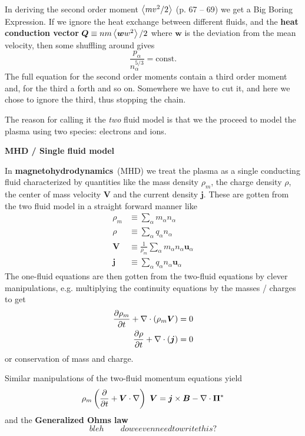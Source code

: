 \documentclass[10pt,landscape]{article}
\renewcommand{\vec}{\bm}
\newcommand{\topiccolor}{green}
\renewcommand{\section}[2]{%
	\renewcommand{\topiccolor}{#2}
	\begin{tcolorbox}[boxsep=0.5mm, left=1mm, right=1mm, top=0mm, bottom=0mm,
		colback=#2!30, colframe=#2, arc is angular]%
		\centering \textbf{#1}%
	\end{tcolorbox}%
	\nopagebreak%
}
\newcommand{\cbf}[1]{\textcolor{\topiccolor!80!black}{\textbf{#1}}}
\begin{document}
\begin{multicols*}{3}
In deriving the second order moment $\left\langle mv^2/2\right\rangle$ (p. 67 -- 69) we get
a Big Boring Expression\texttrademark.
If we ignore the heat exchange between different fluids, and the
\cbf{heat conduction vector}
$\vec Q \equiv n m \expval{\vec w w^2} / 2$
where $\vec w$ is the deviation from the mean velocity,
then some shuffling around gives
\[
	\frac{p_\alpha}{n_\alpha^{5/3}} = \text{const.}
\]
The full equation for the second order moments contain a third order moment and,
for the third a forth and so on.
Somewhere we have to cut it, and here we chose to ignore the third,
thus stopping the chain.

The reason for calling it the \emph{two} fluid model is that we the proceed
to model the plasma using two species: electrons and ions.

\section{MHD / Single fluid model}{lime}

In \cbf{magnetohydrodynamics} (MHD) we treat the plasma as a single conducting
fluid characterized by quantities like the mass density $\rho_m$, the charge
density $\rho$, the center of mass velocity $\vec V$ and the current density
$\vec j$.
These are gotten from the two fluid model in a straight forward manner like
\begin{align*}
	\rho_m &\equiv \sum_\alpha m_\alpha n_\alpha\\
	\rho &\equiv \sum_\alpha q_\alpha n_\alpha\\
	\vec V &\equiv \frac{1}{\rho_m} \sum_\alpha m_\alpha n_\alpha \vec u_\alpha\\
	\vec j &\equiv \sum_\alpha q_\alpha n_\alpha \vec u_\alpha
\end{align*}
The one-fluid equations are then gotten from the two-fluid equations by clever
manipulations, e.g. multiplying the continuity equations by the masses / charges
to get
\begin{align*}
	\diffp{\rho_m}{t} + \nabla \cdot (\rho_m \vec V) = 0\\
	\diffp{\rho}{t} + \nabla \cdot (\vec j) = 0
\end{align*}
or conservation of mass and charge.

Similar manipulations of the two-fluid momentum equations yield
\[
	\rho_m\left(\diffp{}{t} + \vec V \cdot \nabla\right) \vec V
	= \vec j \times \vec B - \nabla \cdot \vec \Pi^*
\]
and the \cbf{Generalized Ohms law}
\[
	bleh\qquad do we even need to write this?
\]


\end{multicols*}
\end{document}
